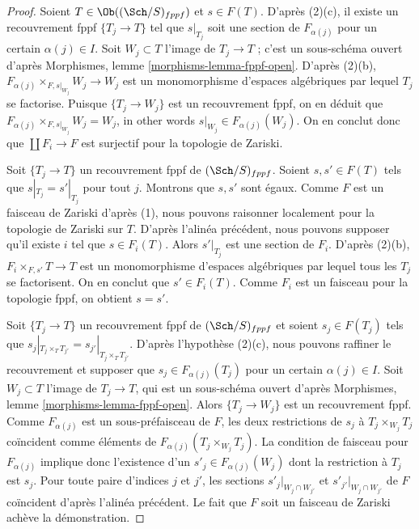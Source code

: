\begin{proof}
Soient $T \in \Ob((\Sch/S)_{fppf})$ et $s \in F(T)$. D'après (2)(c),
il existe un recouvrement fppf $\{T_j \to T\}$ tel que
$s|_{T_j}$ soit une section de $F_{\alpha(j)}$ pour un certain $\alpha(j) \in I$.
Soit $W_j \subset T$ l'image de $T_j \to T$ ;
c'est un sous-schéma ouvert d'après Morphismes, lemme \ref{morphisms-lemma-fppf-open}.
D'après (2)(b),
$F_{\alpha(j)} \times_{F, s|_{W_j}} W_j \to W_j$ est un monomorphisme
d'espaces algébriques par lequel $T_j$ se factorise. Puisque $\{T_j \to W_j\}$
est un recouvrement fppf, on en déduit que
$F_{\alpha(j)} \times_{F, s|_{W_j}} W_j = W_j$, in other words
$s|_{W_j} \in F_{\alpha(j)}(W_j)$. On en conclut donc que
$\coprod F_i \to F$ est surjectif pour la topologie de Zariski.

\medskip\noindent
Soit $\{T_j \to T\}$ un recouvrement fppf de $(\Sch/S)_{fppf}$.
Soient $s, s' \in F(T)$ tels que $s|_{T_j} = s'|_{T_j}$ pour tout $j$.
Montrons que $s, s'$ sont égaux. Comme $F$ est un faisceau de Zariski d'après (1),
nous pouvons raisonner localement pour la topologie de Zariski sur $T$. D'après l'alinéa précédent,
nous pouvons supposer qu'il existe $i$ tel que $s \in F_i(T)$. Alors
$s'|_{T_j}$ est une section de $F_i$. D'après (2)(b),
$F_{i} \times_{F, s'} T \to T$ est un monomorphisme d'espaces algébriques
par lequel tous les $T_j$ se factorisent. On en conclut que
$s' \in F_i(T)$. Comme $F_i$ est un faisceau pour la topologie fppf,
on obtient $s = s'$.

\medskip\noindent
Soit $\{T_j \to T\}$ un recouvrement fppf de $(\Sch/S)_{fppf}$ et soient
$s_j \in F(T_j)$ tels que
$s_j|_{T_j \times_T T_{j'}} = s_{j'}|_{T_j \times_T T_{j'}}$. D'après l'hypothèse
(2)(c), nous pouvons raffiner le recouvrement et supposer que $s_j \in F_{\alpha(j)}(T_j)$
pour un certain $\alpha(j) \in I$. Soit $W_j \subset T$ l'image de $T_j \to T$,
qui est un sous-schéma ouvert d'après Morphismes, lemme \ref{morphisms-lemma-fppf-open}.
Alors $\{T_j \to W_j\}$ est un recouvrement fppf. Comme $F_{\alpha(j)}$ est un
sous-préfaisceau de $F$, les deux restrictions de $s_j$ à
$T_j \times_{W_j} T_j$ coïncident comme éléments de
$F_{\alpha(j)}(T_j \times_{W_j} T_j)$. La condition de faisceau pour
$F_{\alpha(j)}$ implique donc l'existence d'un $s'_j \in F_{\alpha(j)}(W_j)$
dont la restriction à $T_j$ est $s_j$. Pour toute paire d'indices
$j$ et $j'$, les sections $s'_j|_{W_j \cap W_{j'}}$ et
$s'_{j'}|_{W_j \cap W_{j'}}$ de $F$ coïncident d'après l'alinéa
précédent. Le fait que $F$ soit un faisceau de Zariski achève
la démonstration.
\end{proof}





